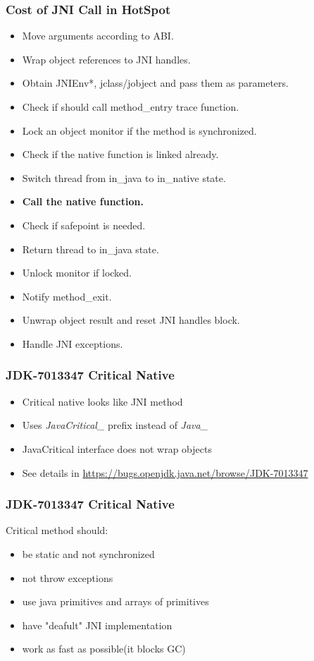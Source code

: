 \documentclass{beamer}
\begin{document}
  	\begin{frame}
  		\frametitle{Cost of JNI Call	in HotSpot}
  		\begin{itemize}
  			\item Move arguments according to ABI.
  			\item Wrap object references to JNI handles.
  			\item Obtain JNIEnv*, jclass/jobject and pass them as parameters.
  			\item Check if should call method\_entry trace function.
  			\item Lock an object monitor if the method is synchronized.
  			\item Check if the native function is linked already.%
  			\item Switch thread from in\_java to in\_native state.
  			\item \textbf{Call the native function.}
  			\item Check if safepoint is needed.
  			\item Return thread to in\_java state.
  			\item Unlock monitor if locked.
  			\item Notify method\_exit.
  			\item Unwrap object result and reset JNI handles block.
  			\item Handle JNI exceptions.
  		\end{itemize}
  	\end{frame}
  	\begin{frame}
  		\frametitle{JDK-7013347 Critical Native}
  		\begin{itemize}
  			\item Critical native looks like JNI method
  			\item Uses \textit{JavaCritical\_} prefix instead of \textit{Java\_}
  			\item JavaCritical interface does not wrap objects
  			\item See details in \url{https://bugs.openjdk.java.net/browse/JDK-7013347}
  		\end{itemize}
  	\end{frame}
  	\begin{frame}
  		\frametitle{JDK-7013347 Critical Native}
  		Critical method should:	
  		\begin{itemize}
  			\item be static and not synchronized
  			\item not throw exceptions
  			\item use java primitives and arrays of primitives
  			\item have "deafult" JNI implementation
  			\item work as fast as possible(it blocks GC)
  		\end{itemize}
  	\end{frame}  
\end{document}
